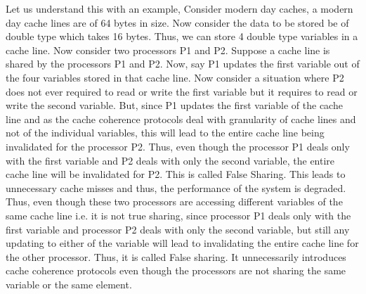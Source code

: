 \documentclass[12pt]{article}
\begin{document}
Let us understand this with an example, Consider modern day caches, a modern day cache lines are of 64 bytes in size. 
Now consider the data to be stored be of double type which takes 16 bytes. Thus, we can store 4 double type variables in a cache line.
Now consider two processors P1 and P2. Suppose a cache line is shared by the processors P1 and P2. 
Now, say P1 updates the first variable out of the four variables stored in that cache line. Now consider a situation 
where P2 does not ever required to read or write the first variable but it requires to read or write the second variable.
But, since P1 updates the first variable of the cache line and as the cache coherence protocols deal with granularity of cache lines and not
of the individual variables, this will lead to the entire cache line being invalidated for the processor P2. Thus, even though the processor P1 deals only with the first variable and P2 deals with only the second variable,
the entire cache line will be invalidated for P2. This is called False Sharing. This leads to unnecessary cache misses and thus, the performance of the system is degraded. Thus, even though these two processors are accessing different variables of the same cache line
i.e. it is not true sharing, since processor P1 deals only with the first variable and processor P2 deals with only the second variable, but still any updating to either of the variable will lead to invalidating the entire cache line for the other processor. 
Thus, it is called False sharing. It unnecessarily introduces cache coherence protocols even though the processors are not sharing the same variable or the same element.

\newpage
\end{document}
